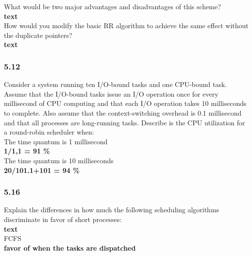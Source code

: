 \documentclass[a4paper,10pt,titlepage]{report}
\begin{document}
\hspace{10mm}What would be two major advantages and disadvantages of this scheme?\\
\hspace{20mm} \textbf{text} \\


\hspace{10mm}How would you modify the basic RR algorithm to achieve the same effect without the duplicate pointers?\\
\hspace{20mm} \textbf{text} \\


\subsubsection{5.12}
Consider a system running ten I/O-bound tasks and one CPU-bound task. Assume that the I/O-bound tasks issue an I/O operation once for every millisecond of CPU computing and that each I/O operation takes 10 milliseconds to complete. Also assume that the context-switching overhead is 0.1 millisecond and that all processes are long-running tasks. Describe is the CPU utilization for a round-robin scheduler when:
\\
\hspace{10mm}The time quantum is 1 millisecond\\
\hspace{20mm} \textbf{1/1,1 = 91 \%} \\


\hspace{10mm}The time quantum is 10 milliseconds\\
\hspace{20mm} \textbf{20/101.1+101 = 94 \%} \\

\subsubsection{5.16}
Explain the differences in how much the following scheduling algorithms discriminate in favor of short processes:\\
\hspace{20mm} \textbf{text} \\


\hspace{10mm}FCFS\\
\hspace{20mm} \textbf{ favor of when the tasks are dispatched} \\
\end{document}

